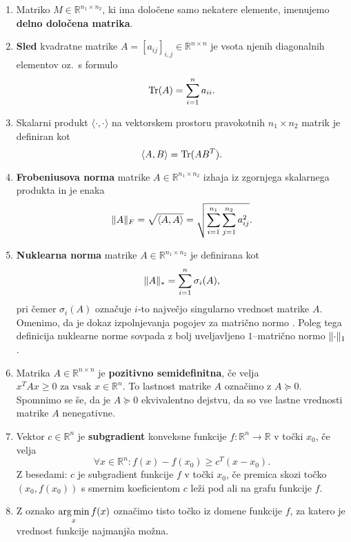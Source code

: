 \begin{enumerate}
  \item Matriko $M \in \mathbb{R}^{n_1 \times n_2}$, ki ima določene samo nekatere elemente, imenujemo \textbf{delno določena matrika}.
  \item \textbf{Sled} kvadratne  matrike $A=[a_{ij}]_{i,j}\in \mathbb R^{n\times n}$ je vsota njenih diagonalnih elementov
        oz.\ s formulo
        \[
          \operatorname{Tr}(A) = \sum_{i = 1}^{n} a_{ii}.
        \]
  \item Skalarni produkt
        $\langle\cdot,\cdot\rangle$ na vektorskem prostoru pravokotnih $n_1\times n_2$ matrik je definiran kot \[
          \langle A, B \rangle = \operatorname{Tr}(AB^T).
        \]
  \item \textbf{Frobeniusova norma} matrike $A \in \mathbb{R}^{n_1 \times n_2}$ izhaja iz zgornjega skalarnega produkta in je enaka \[
          \lVert A\rVert_F =
          \sqrt{\langle A, A \rangle}=
          \sqrt{\sum_{i = 1}^{n_1} \sum_{j = 1}^{n_2} a_{ij}^2}.
        \]
  \item \textbf{Nuklearna norma} matrike $A\in \mathbb R^{n_1\times n_2}$ je definirana kot \[
          \lVert A\rVert_* = \sum_{i = 1}^{n} \sigma_i(A),
        \] pri čemer $\sigma_i(A)$ označuje $i$-to največjo singularno vrednost matrike $A$.
        Omenimo, da je dokaz izpolnjevanja pogojev za matrično normo \cite[izrek 5.6.18]{matrixAnalysis}. Poleg tega definicija nuklearne norme sovpada z bolj uveljavljeno $1$--matrično normo $\lVert\cdot\rVert_1$.
  \item Matrika $A \in \mathbb{R}^{n \times n}$ je \textbf{pozitivno semidefinitna}, če velja $x^TAx \ge 0 \text{ za vsak } x \in \mathbb{R}^n$. To lastnost matrike $A$ označimo z $A \succeq 0$.
        Spomnimo se še, da je $A \succeq 0$ ekvivalentno dejstvu, da so vse  lastne vrednosti matrike $A$ nenegativne.
  \item Vektor $c\in \mathbb R^n$ je \textbf{subgradient} konveksne funkcije $f: \mathbb{R}^n \rightarrow \mathbb{R}$ v točki $x_0$, če velja
        \[
          \forall x\in\mathbb R^n: f(x) - f(x_0) \geq c^T(x - x_0).
        \]
        Z besedami: $c$ je subgradient funkcije $f$ v točki $x_0$, če premica skozi točko $(x_0,f(x_0))$ s smernim koeficientom $c$ leži pod ali na grafu funkcije $f$.
  \item Z oznako
        $\displaystyle\operatorname*{arg\,min}_x f(x)$
        označimo tisto točko iz domene funkcije $f$, za katero je vrednost funkcije najmanjša možna.
\end{enumerate}






